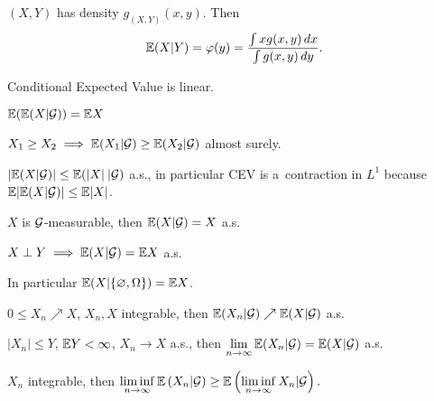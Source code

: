 



	\begin{example}
		$(X, Y)$ has density $g_{(X,Y)}(x,y)$.
		Then $$\mathbb{E}(X|Y) = \varphi(y) =
			\frac{\int x g(x,y)\,dx}{\int g(x,y)\,dy}.$$
	\end{example}
	
	\begin{proposition}
		Conditional Expected Value is linear.
	\end{proposition}
	
	\begin{proposition}
		$\mathbb{E}(\mathbb{E}(X | \mathcal{G})) = \mathbb{E} X$
	\end{proposition}
	
	\begin{proposition}
		$X_1 \geq X_2 \implies \mathbb{E}(X_1 | \mathcal{G}) \geq \mathbb{E}(X_2 | \mathcal{G})$ almost surely.
	\end{proposition}
	
	\begin{proposition}
		$|\mathbb{E}(X | \mathcal{G}) | \leq \mathbb{E}(|X|\: | \mathcal{G})$ a.s.,
		in particular CEV is a~contraction in $L^1$
		because $\mathbb{E}| \mathbb{E}(X | \mathcal{G}) | \leq \mathbb{E} |X|$.
	\end{proposition}

	
	\begin{proposition}
		$X$ is $\mathcal{G}$-measurable, then $\mathbb{E}(X|\mathcal{G}) = X$ a.s.
	\end{proposition}
	
	\begin{proposition}
		$X \perp Y \implies \mathbb{E}(X | \mathcal{G}) = \mathbb{E} X$ a.s.
		
		In particular $\mathbb{E}(X | \{ \varnothing, \Omega\}) = \mathbb{E} X$.
	\end{proposition}
	
	\begin{proposition}
		$0 \leq X_n \nearrow X$, $X_n, X$ integrable,
		then $\mathbb{E}(X_n | \mathcal{G}) \nearrow \mathbb{E}(X|\mathcal{G})$ a.s.
	\end{proposition}
	
	\begin{proposition}
		$|X_n| \leq Y$, $\mathbb{E} Y < \infty$, $X_n \to X$ a.s.,
		then $\displaystyle \lim_{n \to \infty} 
				\mathbb{E}(X_n | \mathcal{G}) = \mathbb{E}(X | \mathcal{G})$ a.s.
	\end{proposition}
	
	\begin{proposition}
		$X_n$ integrable, then $\displaystyle \liminf_{n \to \infty}
		\mathbb{E}\left(X_n | \mathcal{G}\right)
		\geq \mathbb{E}\left(\liminf_{n \to \infty} X_n | \mathcal{G}\right).$
	\end{proposition}
	
